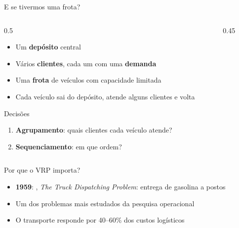 \documentclass[aspectratio=169,xcolor=table]{beamer}
\newcommand{\solucaoexemplo}{%
  \node[dep] (d) at (0,0) {D};
  \foreach \n/\x/\y in {a1/-1/1.5, a2/-2.2/2.4, a3/-3/1, a4/-2/0.2,
                        b1/1/2, b2/2.2/2.8, b3/3.2/1.5, b4/2.2/0.6,
                        c1/0.5/-1.5, c2/2/-2, c3/-0.5/-2.6, c4/-2/-1.6}
    \node[cli] (\n) at (\x,\y) {};
}
\begin{document}
\begin{frame}{E se tivermos uma frota?}
  \begin{columns}[c]
    \begin{column}{0.5\textwidth}
      \begin{itemize}
        \item Um \textbf{depósito} central
        \item Vários \textbf{clientes}, cada um com uma \textbf{demanda}
        \item Uma \textbf{frota} de veículos com capacidade limitada
        \item Cada veículo sai do depósito, atende alguns clientes e volta
      \end{itemize}
      \vspace{0.5em}
      \begin{block}{Decisões}
        \begin{enumerate}
          \item \textbf{Agrupamento}: quais clientes cada veículo atende?
          \item \textbf{Sequenciamento}: em que ordem? 
        \end{enumerate}
      \end{block}
    \end{column}
    \begin{column}{0.45\textwidth}
      \centering
      \\
    \end{column}
  \end{columns}
\end{frame}

\begin{frame}{Por que o VRP importa?}
  \begin{itemize}
    \item \textbf{1959}: , \emph{The Truck Dispatching Problem}: entrega de gasolina a postos
    \item Um dos problemas mais estudados da pesquisa operacional \cite{konstantakopoulos2022vrp,endler2023systematic}
    \item O transporte responde por 40--60\% dos custos logísticos \cite{aghaabdollahian2026overview}
  \end{itemize}
\end{frame}
\end{document}
